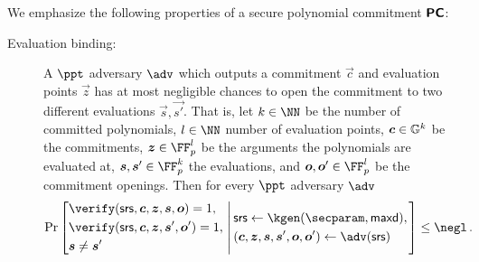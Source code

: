 \documentclass[runningheads,11pt]{llncs}
\begin{document}
We emphasize the following properties of a secure polynomial commitment
$\bm{\mathsf{PC}}$:
\begin{description}
\item[Evaluation binding:] A $\ppt$ adversary $\adv$ which outputs a commitment
  $\vec{c}$ and evaluation points $\vec{z}$ has at most negligible chances to
  open the commitment to two different evaluations $\vec{s}, \vec{s'}$. That is,
  let $k \in \NN$ be the number of committed polynomials, $l \in \NN$ number of
  evaluation points, $\vec{c} \in \GRP^k$ be the commitments,
  $\vec{z} \in \FF_p^l$ be the arguments the polynomials are evaluated at,
  $\vec{s},\vec{s}' \in \FF_p^k$ the evaluations, and
  $\vec{o},\vec{o}' \in \FF_p^l$ be the commitment openings. Then for every
  $\ppt$ adversary $\adv$
	\[
		\Pr
			\left[
			\begin{aligned}
				& \verify(\srs, \vec{c}, \vec{z}, \vec{s}, \vec{o}) = 1,  \\ 
				& \verify(\srs, \vec{c}, \vec{z}, \vec{s}', \vec{o}') = 1, \\
				& \vec{s} \neq \vec{s}'
			\end{aligned}
			\,\left|\,\vphantom{\begin{aligned}
                  & \\
                  & \\
                  &
                \end{aligned}}
			\begin{aligned}
				& \srs \gets \kgen(\secparam, \maxdeg),\\
				& (\vec{c}, \vec{z}, \vec{s}, \vec{s}', \vec{o}, \vec{o}') \gets \adv(\srs)
			\end{aligned}
			\right.\right] \leq \negl\,.
	\]

\end{description}
	
\end{document}
